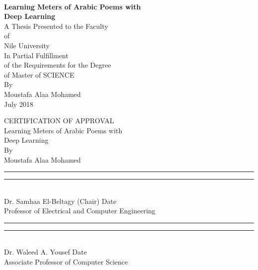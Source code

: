 \thispagestyle{empty}
\begin{centering}
\large{\textbf{\\[1cm]{Learning Meters of Arabic Poems with \\ Deep Learning}}}\\[5cm]
\normalsize{}
A Thesis Presented to the Faculty\\
 of\\
 Nile University\\[5cm]
In Partial Fulfillment\\
of the Requirements for the Degree\\
of Master of SCIENCE\\[3cm]
By\\
Moustafa Alaa Mohamed\\
July 2018\\
\end{centering}
\normalsize{}



\newpage 
\thispagestyle{empty}
\begin{centering}
\normalsize{}
CERTIFICATION OF APPROVAL\\[3cm]
Learning Meters of Arabic Poems with \\ Deep Learning\\[4cm]
 By\\
Moustafa Alaa Mohamed\\[4cm]
\end{centering}

\hspace{-1.7em}
\rule[0em]{22em}{0.5pt} \hspace{4em} \rule[0em]{14em}{0.5pt} \\
\hspace{1em}
Dr. Samhaa El-Beltagy	(Chair)	\hspace{18em} Date\\
Professor of Electrical and Computer Engineering \\[1cm]
\hspace{1em}
\rule[0em]{22em}{0.5pt} \hspace{4em} \rule[0em]{14em}{0.5pt} \\
\hspace{1em}
Dr. Waleed A. Yousef \hspace{22.8em}  Date\\
Associate Professor of Computer Science \\[1cm]
\hspace{1em}

\normalsize{}
\newpage 
{} 

\renewcommand{\contentsname}{\uppercase{Table of Contents}}


